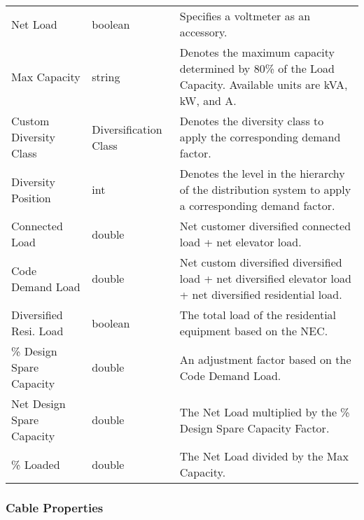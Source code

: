 \documentclass[letterpaper,10pt,english]{sphinxmanual}
\begin{document}
\begin{savenotes}\sphinxattablestart
\centering
\begin{tabulary}{\linewidth}[t]{|T|T|T|}
\hline

&
&
\\
\hline
Net Load
&
boolean
&
Specifies a voltmeter as an accessory.
\\
\hline
Max Capacity
&
string
&
Denotes the maximum capacity determined by 80\% of the Load Capacity.  Available units are kVA, kW, and A.
\\
\hline
Custom Diversity Class
&
Diversification Class
&
Denotes the diversity class to apply the corresponding demand factor.
\\
\hline
Diversity Position
&
int
&
Denotes the level in the hierarchy of the distribution system to apply a corresponding demand factor.
\\
\hline
Connected Load
&
double
&
Net customer diversified connected load + net elevator load.
\\
\hline
Code Demand Load
&
double
&
Net custom diversified diversified load + net diversified elevator load + net diversified residential load.
\\
\hline
Diversified Resi. Load
&
boolean
&
The total load of the residential equipment based on the NEC.
\\
\hline
\% Design Spare Capacity
&
double
&
An adjustment factor based on the Code Demand Load.
\\
\hline
Net Design Spare Capacity
&
double
&
The Net Load multiplied by the \% Design Spare Capacity Factor.
\\
\hline
\% Loaded
&
double
&
The Net Load divided by the Max Capacity.
\\
\hline
\end{tabulary}
\par
\sphinxattableend\end{savenotes}


\subsubsection{Cable Properties}
\label{\detokenize{docs/definitions/index-definitions:cable-properties}}\label{\detokenize{docs/definitions/index-definitions:id4}}
\end{document}
